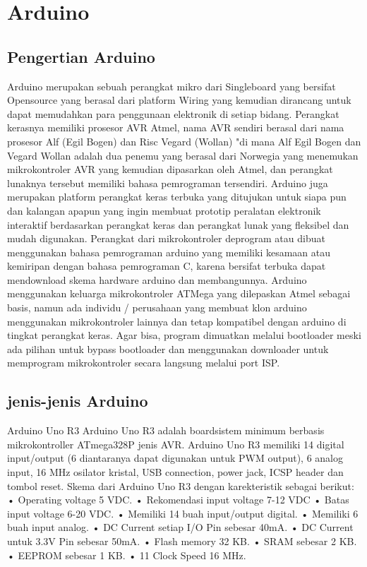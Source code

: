 \section{Arduino}
\subsection{Pengertian Arduino}
Arduino merupakan sebuah perangkat mikro dari Singleboard yang bersifat Opensource yang berasal dari platform Wiring yang kemudian dirancang untuk dapat memudahkan para penggunaan elektronik di setiap bidang. Perangkat kerasnya memiliki prosesor AVR Atmel, nama AVR sendiri berasal dari nama prosesor Alf (Egil Bogen) dan Risc Vegard (Wollan) "di mana Alf Egil Bogen dan Vegard Wollan adalah dua penemu yang berasal dari Norwegia yang menemukan mikrokontroler AVR yang kemudian dipasarkan oleh Atmel, dan perangkat lunaknya tersebut memiliki bahasa pemrograman tersendiri. 
Arduino juga merupakan platform perangkat keras terbuka yang ditujukan untuk siapa pun dan kalangan apapun yang ingin membuat prototip peralatan elektronik interaktif berdasarkan perangkat keras dan perangkat lunak yang fleksibel dan mudah digunakan. Perangkat dari mikrokontroler deprogram atau dibuat menggunakan bahasa pemrograman arduino yang memiliki kesamaan atau kemiripan dengan bahasa pemrograman C, karena bersifat terbuka dapat mendownload skema hardware arduino dan membangunnya. 
Arduino menggunakan keluarga mikrokontroler ATMega yang dilepaskan Atmel sebagai basis, namun ada individu / perusahaan yang membuat klon arduino menggunakan mikrokontroler lainnya dan tetap kompatibel dengan arduino di tingkat perangkat keras. Agar bisa, program dimuatkan melalui bootloader meski ada pilihan untuk bypass bootloader dan menggunakan downloader untuk memprogram mikrokontroler secara langsung melalui port ISP.

\subsection{jenis-jenis Arduino}
Arduino Uno R3
Arduino Uno R3 adalah boardsistem minimum berbasis mikrokontroller ATmega328P jenis AVR. Arduino Uno R3 memiliki 14 digital input/output (6
diantaranya dapat digunakan untuk PWM output), 6 analog input, 16 MHz osilator kristal, USB connection, power jack, ICSP header dan tombol reset. Skema dari Arduino Uno R3 dengan
karekteristik sebagai berikut:
• Operating voltage 5 VDC.
• Rekomendasi input voltage 7-12
VDC
• Batas input voltage 6-20 VDC.
• Memiliki 14 buah input/output
digital.
• Memiliki 6 buah input analog.
• DC Current setiap I/O Pin sebesar
40mA.
• DC Current untuk 3.3V Pin sebesar
50mA.
• Flash memory 32 KB.
• SRAM sebesar 2 KB.
• EEPROM sebesar 1 KB.
• 11 Clock Speed 16 MHz.

